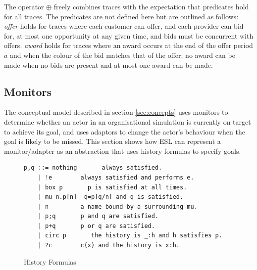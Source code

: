 \documentclass[10pt,numbers]{sigplanconf}
\begin{document}
The operator $\oplus$ freely combines traces with the expectation that predicates hold for all traces. The predicates are not defined here but are outlined as follows: {\it offer} holds for traces where each customer can offer, and each provider can bid for, at most one opportunity at any given time, and bids must be concurrent with offers. {\it award} holds for traces where an award occurs at the end of the offer period $a$ and when the colour of the bid matches that of the offer; no award can be made when no bids are present and at most one award can be made.

\subsection{Monitors}

\label{sec:monitors}

The conceptual model described in section \ref{sec:concepts} uses monitors to determine whether an actor in an organisational simulation is currently on target to achieve its goal, and uses adaptors to change the actor's behaviour when the goal is likely to be missed. This section shows how ESL can represent a monitor/adapter as an abstraction that uses history formulas to specify goals.


\begin{figure}
\begin{lstlisting}[deletekeywords={and}]
p,q ::= nothing       always satisfied.
    | !e        always satisfied and performs e.
    | box p       p is satisfied at all times.
    | mu n.p[n]  q=p[q/n] and q is satisfied.
    | n         a name bound by a surrounding mu.
    | p;q       p and q are satisfied.
    | p+q       p or q are satisfied.
    | circ p       the history is _:h and h satisfies p.
    | ?c        c(x) and the history is x:h.
\end{lstlisting}
\caption{History Formulas}
\label{fig:history_formulas}
\end{figure}
\end{document}
